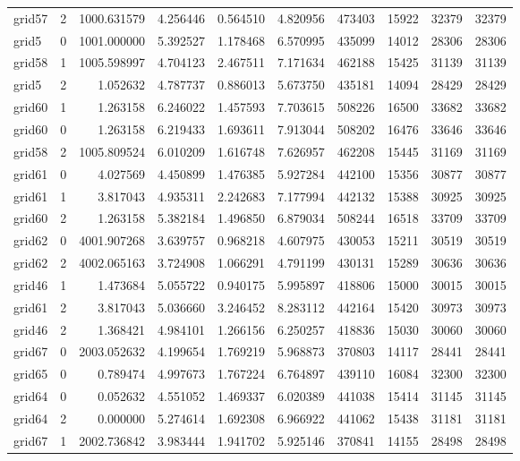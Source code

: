 \begin{longtable}{|l|r|r|r|r|r|r|r|r|r|}
grid57 & 2 & 1000.631579 & 4.256446 & 0.564510 & 4.820956 & 473403 & 15922 & 32379 & 32379 \\
grid5 & 0 & 1001.000000 & 5.392527 & 1.178468 & 6.570995 & 435099 & 14012 & 28306 & 28306 \\
grid58 & 1 & 1005.598997 & 4.704123 & 2.467511 & 7.171634 & 462188 & 15425 & 31139 & 31139 \\
grid5 & 2 & 1.052632 & 4.787737 & 0.886013 & 5.673750 & 435181 & 14094 & 28429 & 28429 \\
grid60 & 1 & 1.263158 & 6.246022 & 1.457593 & 7.703615 & 508226 & 16500 & 33682 & 33682 \\
grid60 & 0 & 1.263158 & 6.219433 & 1.693611 & 7.913044 & 508202 & 16476 & 33646 & 33646 \\
grid58 & 2 & 1005.809524 & 6.010209 & 1.616748 & 7.626957 & 462208 & 15445 & 31169 & 31169 \\
grid61 & 0 & 4.027569 & 4.450899 & 1.476385 & 5.927284 & 442100 & 15356 & 30877 & 30877 \\
grid61 & 1 & 3.817043 & 4.935311 & 2.242683 & 7.177994 & 442132 & 15388 & 30925 & 30925 \\
grid60 & 2 & 1.263158 & 5.382184 & 1.496850 & 6.879034 & 508244 & 16518 & 33709 & 33709 \\
grid62 & 0 & 4001.907268 & 3.639757 & 0.968218 & 4.607975 & 430053 & 15211 & 30519 & 30519 \\
grid62 & 2 & 4002.065163 & 3.724908 & 1.066291 & 4.791199 & 430131 & 15289 & 30636 & 30636 \\
grid46 & 1 & 1.473684 & 5.055722 & 0.940175 & 5.995897 & 418806 & 15000 & 30015 & 30015 \\
grid61 & 2 & 3.817043 & 5.036660 & 3.246452 & 8.283112 & 442164 & 15420 & 30973 & 30973 \\
grid46 & 2 & 1.368421 & 4.984101 & 1.266156 & 6.250257 & 418836 & 15030 & 30060 & 30060 \\
grid67 & 0 & 2003.052632 & 4.199654 & 1.769219 & 5.968873 & 370803 & 14117 & 28441 & 28441 \\
grid65 & 0 & 0.789474 & 4.997673 & 1.767224 & 6.764897 & 439110 & 16084 & 32300 & 32300 \\
grid64 & 0 & 0.052632 & 4.551052 & 1.469337 & 6.020389 & 441038 & 15414 & 31145 & 31145 \\
grid64 & 2 & 0.000000 & 5.274614 & 1.692308 & 6.966922 & 441062 & 15438 & 31181 & 31181 \\
grid67 & 1 & 2002.736842 & 3.983444 & 1.941702 & 5.925146 & 370841 & 14155 & 28498 & 28498 \\

\end{longtable}
